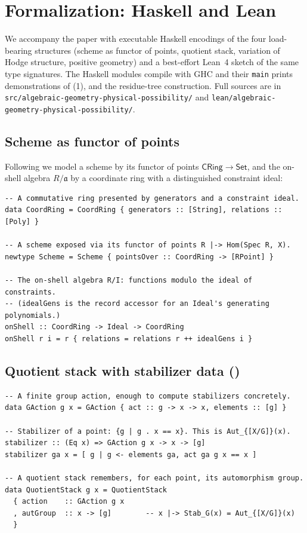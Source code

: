 \documentclass[12pt]{article}
\theoremstyle{definition}
\theoremstyle{remark}
\newcommand{\Set}{\mathsf{Set}}
\newcommand{\CRing}{\mathsf{CRing}}
\newcommand{\Ideal}{\mathfrak{a}}
\begin{document}
\section{Formalization: Haskell and Lean}
\label{sec:code}

We accompany the paper with executable \textsf{Haskell} encodings of the four load-bearing structures
(scheme as functor of points, quotient stack, variation of Hodge structure, positive geometry) and a
best-effort \textsf{Lean~4} sketch of the same type signatures. The Haskell modules compile with GHC and
their \texttt{main} prints demonstrations of (1), and the residue-tree
construction. Full sources are in
\texttt{src/\allowbreak algebraic-\allowbreak geometry-\allowbreak physical-\allowbreak possibility/}
and
\texttt{lean/\allowbreak algebraic-\allowbreak geometry-\allowbreak physical-\allowbreak possibility/}.

\subsection{Scheme as functor of points}

Following  we model a scheme by its functor of points $\CRing\to\Set$, and the on-shell
algebra $R/\Ideal$ by a coordinate ring with a distinguished constraint ideal:
\begin{verbatim}
-- A commutative ring presented by generators and a constraint ideal.
data CoordRing = CoordRing { generators :: [String], relations :: [Poly] }

-- A scheme exposed via its functor of points R |-> Hom(Spec R, X).
newtype Scheme = Scheme { pointsOver :: CoordRing -> [RPoint] }

-- The on-shell algebra R/I: functions modulo the ideal of constraints.
-- (idealGens is the record accessor for an Ideal's generating polynomials.)
onShell :: CoordRing -> Ideal -> CoordRing
onShell r i = r { relations = relations r ++ idealGens i }
\end{verbatim}

\subsection[Quotient stack with stabilizer data]{Quotient stack with stabilizer data ()}

\begin{verbatim}
-- A finite group action, enough to compute stabilizers concretely.
data GAction g x = GAction { act :: g -> x -> x, elements :: [g] }

-- Stabilizer of a point: {g | g . x == x}. This is Aut_{[X/G]}(x).
stabilizer :: (Eq x) => GAction g x -> x -> [g]
stabilizer ga x = [ g | g <- elements ga, act ga g x == x ]

-- A quotient stack remembers, for each point, its automorphism group.
data QuotientStack g x = QuotientStack
  { action    :: GAction g x
  , autGroup  :: x -> [g]        -- x |-> Stab_G(x) = Aut_{[X/G]}(x)
  }
\end{verbatim}
\end{document}
